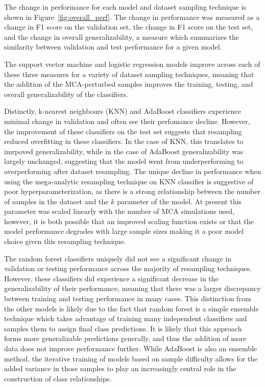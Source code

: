 \documentclass[10pt]{SelfArx} %
\begin{document}
The change in performance for each model and dataset sampling technique is shown in Figure~\ref{fig:overall_perf}. The
change in performance was measured as a change in F1 score on the validation set, the change in F1 score on the test
set, and the change in overall generalizability, a measure which summarizes the similarity between validation and test
performance for a given model.

The support vector machine and logistic regression models improve across each of these three measures for a variety of
dataset sampling techniques, meaning that the addition of the MCA-perturbed samples improves the training, testing, and
overall generalizability of the classifiers.

Distinctly, k-nearest neighbours (KNN) and AdaBoost classifiers experience minimal change in validation and often see
their perfomance decline. However, the improvement of these classifiers on the test set suggests that resampling
reduced overfitting in these classifiers. In the case of KNN, this translates to imrpoved generalizability, while in
the case of AdaBoost generalizability was largely unchanged, suggesting that the model went from underperforming to
overperforming after dataset resampling. The unique decline in performance when using the mega-analytic resampling
technique on KNN classifier is suggestive of poor hyperparameterization, as there is a strong relationship between the
number of samples in the dataset and the $k$ parameter of the model. At present this parameter was scaled linearly with
the number of MCA simulations used, however, it is both possible that an improved scaling function exists or that the
model performance degrades with large sample sizes making it a poor model choice given this resampling technique.

The random forest classifiers uniquely did not see a significant change in validation or testing performance across the
majority of resampling techniques. However, these classifiers did experience a significant decrease in the
generalizability of their performance, meaning that there was a larger discrepancy between training and testing
performance in many cases. This distinction from the other models is likely due to the fact that random forest is a
simple ensemble technique which takes advantage of training many independent classifiers and samples them to assign
final class predictions. It is likely that this approach forms more generalizable predictions generally, and thus the
addition of more data does not improve performance further. While AdaBoost is also an ensemble method, the iterative
training of models based on sample difficulty allows for the added variance in those samples to play an increasingly
central role in the construction of class relationships.
\end{document}
